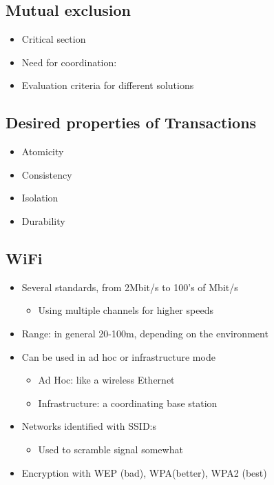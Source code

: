 \begin{multicols}{2}
\subsection{Mutual exclusion}
\begin{itemize}
\item Critical section
\item Need for coordination:
\item Evaluation criteria for different solutions
\end{itemize}


\subsection{Desired properties of Transactions}
\begin{itemize}
\item Atomicity
\item Consistency
\item Isolation
\item Durability
\end{itemize}

\subsection{WiFi}
\begin{itemize}
\item Several standards, from 2Mbit/s to 100’s of Mbit/s
  \begin{itemize}
    \item Using multiple channels for higher speeds
  \end{itemize}
\item Range: in general 20-100m, depending on the environment
\item Can be used in ad hoc or infrastructure mode
  \begin{itemize}
    \item Ad Hoc: like a wireless Ethernet
    \item Infrastructure: a coordinating base station
  \end{itemize}
\item Networks identified with SSID:s
  \begin{itemize}
    \item Used to scramble signal somewhat
  \end{itemize}
\item Encryption with WEP (bad), WPA(better), WPA2 (best)
\end{itemize}


\end{multicols}

